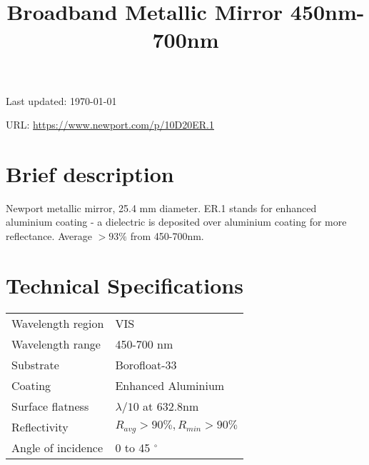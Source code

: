 \documentclass{article}
\title{\vspace{-4cm}Broadband Metallic Mirror 450nm-700nm}
\date{}
\begin{document}
\maketitle

\vspace{-1cm}

Last updated: \today

URL: \url{https://www.newport.com/p/10D20ER.1}

\begin{multicols}{2}

\section{Brief description}


Newport metallic mirror, 25.4 mm diameter. ER.1 stands for enhanced aluminium coating - a dielectric is deposited over aluminium coating for more reflectance. Average $>93\%$ from 450-700nm.



\section{Technical Specifications}

\begin{tabular}{|l|l|}
Wavelength region & VIS \\
Wavelength range & 450-700 nm \\
Substrate & Borofloat-33\\
Coating & Enhanced Aluminium \\
Surface flatness & $\lambda/10$ at 632.8nm \\
Reflectivity & $R_{avg} > 90\%, R_{min} > 90\%$\\
Angle of incidence & 0 to 45 $^{\circ}$ \\
\end{tabular}%


\end{multicols}
\end{document}
